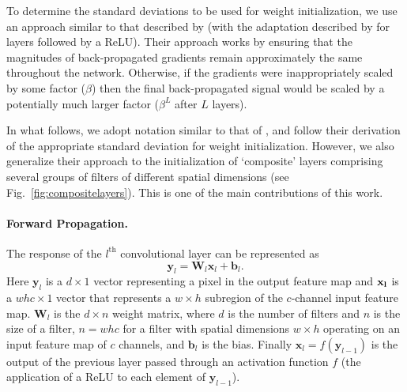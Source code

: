 \documentclass[thesis]{subfiles}
\begin{document}
    To determine the standard deviations to be used for weight initialization, we use an approach similar to that described by \citet{glorot2010understanding} (with the adaptation described by \citet{He2015delving} for layers followed by a ReLU). Their approach works by ensuring that the magnitudes of back-propagated gradients remain approximately the same throughout the network. Otherwise, if the gradients were inappropriately scaled by some factor (\eg $\beta$) then the final back-propagated signal would be scaled by a potentially much larger factor ($\beta^L$ after $L$ layers).
    
    In what follows, we adopt notation similar to that of \citet{He2015delving}, and follow their derivation of the appropriate standard deviation for weight initialization. However, we also generalize their approach to the initialization of `composite' layers comprising several groups of filters of different spatial dimensions (see Fig.~\ref{fig:compositelayers}). This is one of the main contributions of this work.
    
    \paragraph{Forward Propagation.}
    The response of the $l^\text{th}$ convolutional layer can be represented as
    \begin{equation}
    \mathbf{y}_l =\mathbf{W}_l \mathbf{x}_l + \mathbf{b}_l.
    \end{equation}
    Here $\mathbf{y}_l$ is a $d \times 1$ vector representing a pixel in the output feature map and $\bf x_l$ is a $ w h c \times 1$ vector that represents a $w \times h$ subregion of the $c$-channel input feature map. $\mathbf{W}_l$ is the $d\times n$ weight matrix, where $d$ is the number of filters and $n$ is the size of a filter, \ie $n = w h c$ for a filter with spatial dimensions $w \times h$ operating on an input feature map of $c$ channels, and $\mathbf{b}_l$ is the bias. Finally $\mathbf{x}_l = f(\mathbf{y}_{l-1})$ is the output of the previous layer passed through an activation function $f$ (\eg the application of a ReLU to each element of $\mathbf{y}_{l-1}$).
    
\end{document}
